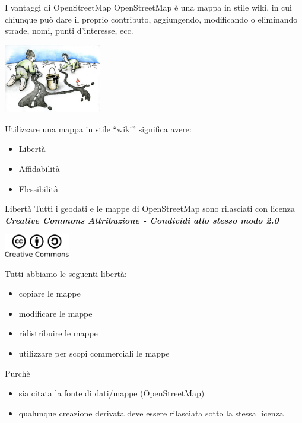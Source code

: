 \documentclass[slidestop,compress,red,notes,xcolor=dvipsnames]{beamer}	%
\begin{document}
    \begin{frame}{I vantaggi di OpenStreetMap}
        OpenStreetMap è una mappa in stile wiki, in cui chiunque può dare il proprio contributo, aggiungendo, modificando o eliminando strade, nomi, punti d'interesse, ecc.
        \begin{center}
            \includegraphics[height=3cm]{images/cartoon.eps}
        \end{center}
        Utilizzare una mappa in stile ``wiki'' significa avere:
        \pause
        \begin{itemize}
            \item Libertà
            \item Affidabilità
            \item Flessibilità
        \end{itemize}
    \end{frame}

    \begin{frame}{Libertà}
        Tutti i geodati e le mappe di OpenStreetMap sono rilasciati con licenza \textit{\textbf{Creative Commons Attribuzione - Condividi allo stesso modo 2.0}}
        \begin{center}
            \includegraphics[height=1cm]{images/cc.eps}
        \end{center}
        Tutti abbiamo le seguenti libertà:
        \pause
        \begin{itemize}
            \item copiare le mappe
            \item modificare le mappe
            \item ridistribuire le mappe
            \item utilizzare per scopi commerciali le mappe
        \end{itemize}
        \pause
        Purchè
        \begin{itemize}
            \item sia citata la fonte di dati/mappe (OpenStreetMap)
            \item qualunque creazione derivata deve essere rilasciata sotto la stessa licenza
        \end{itemize}
    \end{frame}
\end{document}
